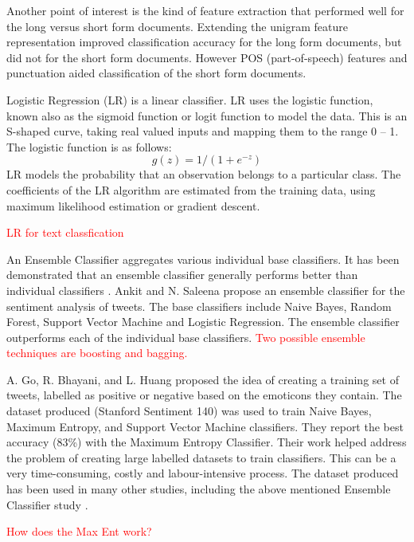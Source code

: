 Another point of interest is the kind of feature extraction that performed well for the long versus short form documents. Extending the unigram feature representation improved classification accuracy for the long form documents, but did not for the short form documents. However POS (part-of-speech) features and punctuation aided classification of the short form documents. 

Logistic Regression (LR) is a linear classifier. LR uses the logistic function, known also as the sigmoid function or logit function to model the data. This is an S-shaped curve, taking real valued inputs and mapping them to the range 0 – 1. The logistic function is as follows: \[g(z)=1/(1+e^{-z})\]
LR models the probability that an observation belongs to a particular class. The coefficients of the LR algorithm are estimated from the training data, using maximum likelihood estimation or gradient descent.

\textcolor{red}{LR for text classfication}

An Ensemble Classifier aggregates various individual base classifiers. It has been demonstrated that an ensemble classifier generally performs better than individual classifiers \cite{Opitz1999}. Ankit and N. Saleena \cite{Ankit2018} propose an ensemble classifier for the sentiment analysis of tweets. The base classifiers include Naive Bayes, Random Forest, Support Vector Machine and Logistic Regression. The ensemble classifier outperforms each of the individual base classifiers.
\textcolor{red}{Two possible ensemble techniques are boosting and bagging.}

A. Go, R. Bhayani, and L. Huang \cite{Go2009} proposed the  idea of creating a training set of tweets, labelled as positive or negative based on the emoticons they contain. The dataset produced (Stanford Sentiment 140) was used to train Naive Bayes, Maximum Entropy, and Support Vector Machine classifiers. They report the best accuracy (83\%) with the Maximum Entropy Classifier. Their work helped address the problem of creating large labelled datasets to train classifiers. This can be a very time-consuming, costly and labour-intensive process. The dataset produced has been used in many other studies, including the above mentioned Ensemble Classifier study \cite{Ankit2018}.

\textcolor{red}{How does the Max Ent work?}


